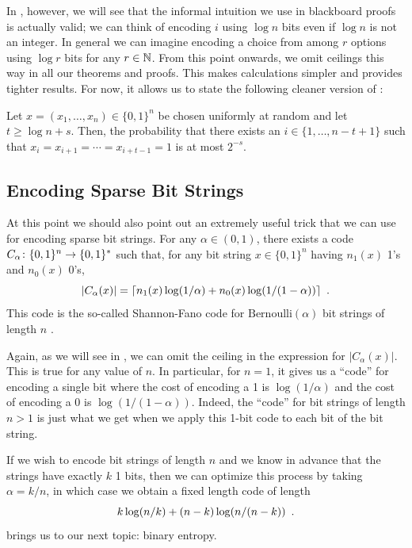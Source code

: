 \documentclass{patmorin}
\newenvironment{customthm}[1]
  {\renewcommand\theinnercustomthm{#1}\innercustomthm}
  {\endinnercustomthm}
\begin{document}
In , however, we will see that the informal intuition
we use in blackboard proofs is actually valid; we can think of
encoding $i$ using $\log n$ bits even if $\log n$ is not an integer.
In general we can imagine encoding a choice from among $r$ options
using $\log r$ bits for any $r\in\mathbb{N}$.  From this point onwards, we
omit ceilings this way in all our theorems and proofs. This makes
calculations simpler and provides tighter results.  For now, it allows
us to state the following cleaner version of :

\begin{customthm}{\ref{thm:runs-i}b}
  Let $x=(x_1,\ldots,x_n)\in\{0,1\}^n$ be chosen uniformly at random
  and let $t \ge \log n + s$. Then, the probability that there exists
  an $i\in\{1,\ldots,n-t+1\}$ such that
  $x_i=x_{i+1}=\cdots=x_{i+t-1}=1$ is at most $2^{-s}$.
\end{customthm}

\subsection{Encoding Sparse Bit Strings}

At this point we should also point out an extremely useful trick that
we can use for encoding sparse bit strings. For any $\alpha\in(0,1)$,
there exists a code $C_\alpha\colon \{0,1\}^n\rightarrow \{0,1\}^*$
such that, for any bit string $x\in\{0,1\}^n$ having $n_1(x)$ 1's and
$n_0(x)$ 0's,
\begin{equation}
  |C_\alpha(x)| = \lceil n_1(x)\log(1/\alpha) + n_0(x)\log(1/(1-\alpha)) \rceil \enspace .
  \eqlabel{sparse-bitstring-i}
\end{equation}
This code is the so-called Shannon-Fano code for
$\mathrm{Bernoulli}(\alpha)$ bit strings of length $n$
\cite{fano:transmission,shannon:mathematical}.

Again, as we will see in , we can omit the ceiling in
the expression for $|C_\alpha(x)|$.  This is true for any value of
$n$. In particular, for $n=1$, it gives us a ``code'' for encoding a
single bit where the cost of encoding a 1 is $\log(1/\alpha)$ and the
cost of encoding a 0 is $\log(1/(1-\alpha))$.  Indeed, the ``code''
for bit strings of length $n>1$ is just what we get when we apply this
1-bit code to each bit of the bit string.

If we wish to encode bit strings of length $n$ and we know in advance
that the strings have exactly $k$ 1 bits, then we can optimize this
process by taking $\alpha=k/n$, in which case we obtain a fixed length
code of length
\begin{equation}
    k\log (n/k) + (n-k)\log(n/(n-k))  \eqlabel{sparse-bitstring-ii} \enspace .
\end{equation}
 brings us to our next topic: binary entropy.
\end{document}
